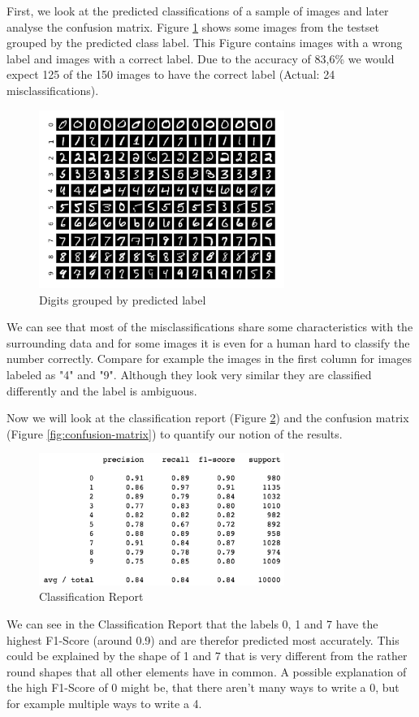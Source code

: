 \documentclass{support/acm_proc_article-sp}
\begin{document}
    First, we look at the predicted classifications of a sample of images and later analyse the confusion matrix.
    Figure \ref{fig:predicted-images} shows some images from the testset grouped by the predicted class label.
    This Figure contains images with a wrong label and images with a correct label.
    Due to the accuracy of 83,6\% we would expect 125 of the 150 images to have the correct label (Actual: 24 misclassifications).
    \begin{figure}[!htbp]
        \centering
        \includegraphics[width=8cm]{images/predicted-images.png}
        \caption{Digits grouped by predicted label}
        \label{fig:predicted-images}
    \end{figure}

    We can see that most of the misclassifications share some characteristics with the surrounding data and for some
    images it is even for a human hard to classify the number correctly.
    Compare for example the images in the first column for images labeled as "4" and "9".
    Although they look very similar they are classified differently and the label is ambiguous.

    Now we will look at the classification report (Figure \ref{fig:classification-report}) and the confusion matrix
    (Figure \ref{fig:confusion-matrix}) to quantify our notion of the results.
    \begin{figure}[!htbp]
        \centering
        \includegraphics[width=8cm]{images/classification-report.png}
        \caption{Classification Report}
        \label{fig:classification-report}
    \end{figure}
    We can see in the Classification Report that the labels 0, 1 and 7 have the highest F1-Score (around 0.9) and are
    therefor predicted most accurately.
    This could be explained by the shape of 1 and 7 that is very different from the rather round shapes that all other
    elements have in common.
    A possible explanation of the high F1-Score of 0 might be, that there aren't many ways to write a 0, but for example
    multiple ways to write a 4.
\end{document}
